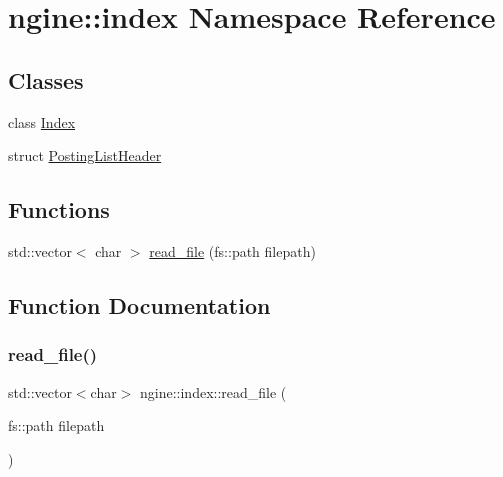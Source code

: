 \hypertarget{namespacengine_1_1index}{}\section{ngine\+:\+:index Namespace Reference}
\label{namespacengine_1_1index}
\subsection*{Classes}
\begin{DoxyCompactItemize}
\item 
class \hyperlink{classngine_1_1index_1_1Index}{Index}
\item 
struct \hyperlink{structngine_1_1index_1_1PostingListHeader}{Posting\+List\+Header}
\end{DoxyCompactItemize}
\subsection*{Functions}
\begin{DoxyCompactItemize}
\item 
std\+::vector$<$ char $>$ \hyperlink{namespacengine_1_1index_a6e517fc84859bec580b20134730b6fc4}{read\+\_\+file} (fs\+::path filepath)
\end{DoxyCompactItemize}


\subsection{Function Documentation}
\mbox{\label{namespacengine_1_1index_a6e517fc84859bec580b20134730b6fc4}} 
\subsubsection{\texorpdfstring{read\+\_\+file()}{read\_file()}}
{\footnotesize\ttfamily std\+::vector$<$char$>$ ngine\+::index\+::read\+\_\+file (\begin{DoxyParamCaption}\item[{fs\+::path}]{filepath }\end{DoxyParamCaption})}

